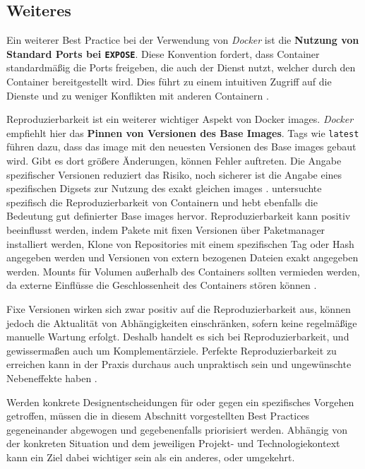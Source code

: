 \subsection{Weiteres}
\label{subsec:05-03-04_further}

Ein weiterer Best Practice bei der Verwendung von \textit{Docker} ist die \textbf{Nutzung von Standard Ports bei \texttt{EXPOSE}}. Diese Konvention fordert, dass Container standardmäßig die Ports freigeben, die auch der Dienst nutzt, welcher durch den Container bereitgestellt wird. Dies führt zu einem intuitiven Zugriff auf die Dienste und zu weniger Konflikten mit anderen Containern \cite{300:Building-Best-Practices}.

Reproduzierbarkeit ist ein weiterer wichtiger Aspekt von Docker \Glspl{image}. \textit{Docker} empfiehlt hier das \textbf{Pinnen von Versionen des Base Images}. Tags wie \texttt{latest} führen dazu, dass das \Gls{image} mit den neuesten Versionen des Base \Glspl{image} gebaut wird. Gibt es dort größere Änderungen, können Fehler auftreten. Die Angabe spezifischer Versionen reduziert das Risiko, noch sicherer ist die Angabe eines spezifischen Digsets zur Nutzung des exakt gleichen \Glspl{image} \cite{300:Building-Best-Practices}. \citeauthor{013:Role-of-Containers-in-Reproducibility} untersuchte spezifisch die Reproduzierbarkeit von Containern und hebt ebenfalls die Bedeutung gut definierter Base \Glspl{image} hervor. Reproduzierbarkeit kann positiv beeinflusst werden, indem Pakete mit fixen Versionen über Paketmanager installiert werden, Klone von Repositories mit einem spezifischen Tag oder Hash angegeben werden und Versionen von extern bezogenen Dateien exakt angegeben werden. Mounts für Volumen außerhalb des Containers sollten vermieden werden, da externe Einflüsse die Geschlossenheit des Containers stören können \cite{013:Role-of-Containers-in-Reproducibility}.

Fixe Versionen wirken sich zwar positiv auf die Reproduzierbarkeit aus, können jedoch die Aktualität von Abhängigkeiten einschränken, sofern keine regelmäßige manuelle Wartung erfolgt. Deshalb handelt es sich bei Reproduzierbarkeit,  und  gewissermaßen auch um Komplementärziele. Perfekte Reproduzierbarkeit zu erreichen kann in der Praxis durchaus auch unpraktisch sein und ungewünschte Nebeneffekte haben \cite{013:Role-of-Containers-in-Reproducibility}.

Werden konkrete Designentscheidungen für oder gegen ein spezifisches Vorgehen getroffen, müssen die in diesem Abschnitt vorgestellten Best Practices gegeneinander abgewogen und gegebenenfalls priorisiert werden. Abhängig von der konkreten Situation und dem jeweiligen Projekt- und Technologiekontext kann ein Ziel dabei wichtiger sein als ein anderes, oder umgekehrt.
